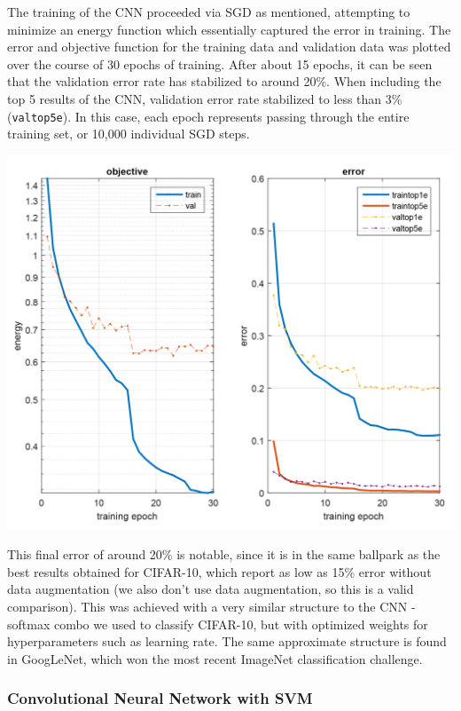 \documentclass[11pt]{article}
\begin{document}
The training of the CNN proceeded via SGD as mentioned, attempting to minimize an energy function which essentially captured the error in training. The error and objective function for the training data and validation data was plotted over the course of 30 epochs of training. After about 15 epochs, it can be seen that the validation error rate has stabilized to around 20\%. When including the top 5 results of the CNN, validation error rate stabilized to less than 3\% (\texttt{valtop5e}). In this case, each epoch represents passing through the entire training set, or 10,000 individual SGD steps.

\begin{center}
\includegraphics[scale=0.35]{convnet_train.PNG} \\
\end{center}

This final error of around 20\% is notable, since it is in the same ballpark as the best results obtained for CIFAR-10, which report as low as 15\% error without data augmentation (we also don't use data augmentation, so this is a valid comparison). This was achieved with a very similar structure to the CNN - softmax combo we used to classify CIFAR-10, but with optimized weights for hyperparameters such as learning rate. The same approximate structure is found in GoogLeNet, which won the most recent ImageNet classification challenge.

\subsubsection{Convolutional Neural Network with SVM}
\end{document}
